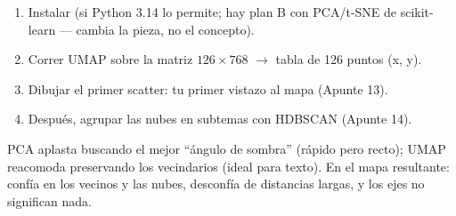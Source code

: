 \documentclass[11pt,a4paper]{article}
\begin{document}
\begin{enumerate}
  \item Instalar  (si Python 3.14 lo permite; hay plan B con PCA/t-SNE
        de scikit-learn — cambia la pieza, no el concepto).
  \item Correr UMAP sobre la matriz $126 \times 768$ $\rightarrow$ tabla de 126 puntos (x, y).
  \item Dibujar el primer scatter: tu primer vistazo al mapa (Apunte 13).
  \item Después, agrupar las nubes en subtemas con HDBSCAN (Apunte 14).
\end{enumerate}

\begin{resumen}
PCA aplasta buscando el mejor ``ángulo de sombra'' (rápido pero recto); UMAP reacomoda
preservando los vecindarios (ideal para texto). En el mapa resultante: confía en los
vecinos y las nubes, desconfía de distancias largas, y los ejes no significan nada.
\end{resumen}
\end{document}
